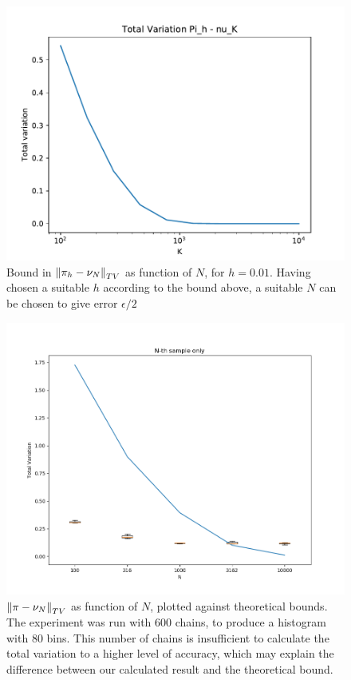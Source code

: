 \begin{figure}[H]
	\centering
		\includegraphics[height=0.35\textheight]{WriteUp/DM_EM_step0pt01.pdf}
	\caption{Bound in $\norm{\pi_h - \nu_N}_{TV}$ as function of $N$, for $h=0.01$.  Having chosen a suitable $h$ according to the bound above, a suitable $N$ can be chosen to give error $\epsilon/2$}
	\label{fig:DM_Pih}
\end{figure}

\begin{figure}[H]
	\centering
		\includegraphics[height=0.35\textheight]{Figures/DM_plot_nth_sample.png}
	\caption{$\norm{\pi - \nu_N}_{TV}$ as function of $N$, plotted against theoretical bounds.  The experiment was run with 600 chains, to produce a histogram with 80 bins.  This number of chains is insufficient to calculate the total variation to a higher level of accuracy, which may explain the difference between our calculated result and the theoretical bound.}
	\label{fig:DMnth}
\end{figure}

